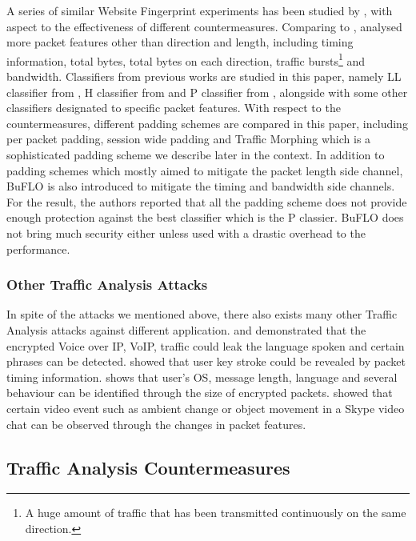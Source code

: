 A series of similar Website Fingerprint experiments has been studied by \cite{Peekaboo}, with aspect to the effectiveness of different countermeasures. Comparing to \cite{WebsiteFingerprint}, \cite{Peekaboo} analysed more packet features other than direction and length, including timing information, total bytes, total bytes on each direction, traffic bursts\footnote{A huge amount of traffic that has been transmitted continuously on the same direction.} and bandwidth. Classifiers from previous works are studied in this paper, namely LL classifier from \cite{WebsiteFingerprint}, H classifier from \cite{HClassifier} and P classifier from \cite{PClassifier}, alongside with some other classifiers designated to specific packet features. With respect to the countermeasures, different padding schemes are compared in this paper, including per packet padding, session wide padding and Traffic Morphing which is a sophisticated padding scheme we describe later in the context. In addition to padding schemes which mostly aimed to mitigate the packet length side channel, BuFLO\cite{Peekaboo} is also introduced to mitigate the timing and bandwidth side channels. For the result, the authors reported that all the padding scheme does not provide enough protection against the best classifier which is the P classier. BuFLO does not bring much security either unless used with a drastic overhead to the performance.

\subsubsection{Other Traffic Analysis Attacks}
In spite of the attacks we mentioned above, there also exists many other Traffic Analysis attacks against different application. \cite{VoIPLanguage} and \cite{VoIPPhrases} demonstrated that the encrypted Voice over IP, VoIP, traffic could leak the language spoken and certain phrases can be detected. \cite{SSHKey} showed that user key stroke could be revealed by packet timing information. \cite{AppleMessage} shows that user's OS, message length, language and several behaviour can be identified through the size of encrypted packets. \cite{Video} showed that certain video event such as ambient change or object movement in a Skype video chat can be observed through the changes in packet features.

\subsection{Traffic Analysis Countermeasures}

